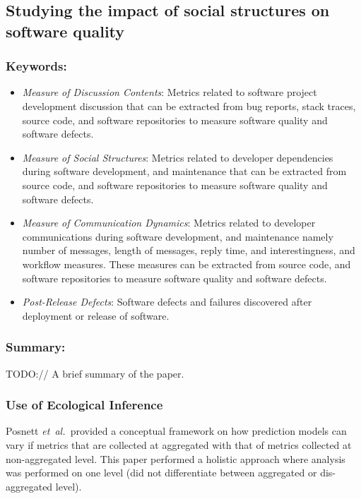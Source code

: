 \documentclass{sig-alternate-05-2015}
\newcommand{\etal}{\mbox{\emph{et al.\ }}}
\begin{document}
\subsection{Studying the impact of social structures on software quality \cite{Bettenburg:2010}}

\subsubsection{Keywords:}
\begin{itemize}
\item \emph{Measure of Discussion Contents}: Metrics related to software project development discussion that can be extracted from bug reports, stack traces, source code, and software repositories to measure software quality and software defects.
\item \emph{Measure of Social Structures}: Metrics related to developer dependencies during software development, and maintenance that can be extracted from source code, and software repositories to measure software quality and software defects.
\item \emph{Measure of Communication Dynamics}: Metrics related to developer communications during software development, and maintenance namely number of messages, length of messages, reply time, and interestingness, and workflow measures. These measures can be extracted from source code, and software repositories to measure software quality and software defects.
\item \emph{Post-Release Defects}: Software defects and failures discovered after deployment or release of software.
\end{itemize} 

\subsubsection{Summary:}
TODO:// A brief summary of the paper.

\subsubsection{Use of Ecological Inference}
Posnett \etal provided a conceptual framework on how prediction models can vary if metrics that are collected at aggregated with that of metrics collected at non-aggregated level. This paper performed a holistic approach where analysis was performed on one level (did not differentiate between aggregated or dis-aggregated level).
\end{document}
